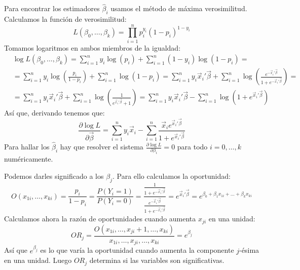 Para encontrar los estimadores $\hat{\beta}_i$ usamos el método de máxima verosimilitud.
Calculamos la función de verosimilitud:
$$L(\beta_0, \dots, \beta_k) = \prod_{i=1}^n p_i^{y_i}(1-p_i)^{1-y_i}$$
Tomamos logaritmos en ambos miembros de la igualdad:
\begin{align*}
     & \log L(\beta_0, \dots, \beta_k) = \sum_{i=1}^n y_i\log(p_i) + \sum_{i=1}^n (1-y_i)\log(1-p_i) =                                                                                                                              \\
     & = \sum_{i=1}^n y_i\log\left(\frac{p_i}{1-p_i}\right) + \sum_{i=1}^n \log(1-p_i) = \sum_{i=1}^n y_i \vec{x}_i'\vec{\beta} + \sum_{i=1}^n \log\left(\frac{e^{-\vec{x}_i'\vec{\beta}}}{1 + e^{-\vec{x}_i'\vec{\beta}}}\right) = \\
     & = \sum_{i=1}^n y_i \vec{x}_i'\vec{\beta} + \sum_{i=1}^n \log\left(\frac{1}{e^{\vec{x}_i'\vec{\beta}} + 1}\right) = \sum_{i=1}^n y_i \vec{x}_i'\vec{\beta} - \sum_{i=1}^n \log(1 + e^{\vec{x}_i'\vec{\beta}})
\end{align*}
Así que, derivando tenemos que:
$$\frac{\partial \log L}{\partial \vec{\beta}} = \sum_{i=1}^n y_i\vec{x}_i - \sum_{i=1}^n \frac{\vec{x}_i e^{\vec{x}_i'\vec{\beta}}}{1 + e^{\vec{x}_i'\vec{\beta}}}$$
Para hallar los $\hat{\beta}_i$ hay que resolver el sistema $\frac{\partial \log L}{\partial \beta_i} = 0$ para todo $i = 0, \dots, k$ numéricamente.

Podemos darles significado a los $\beta_j$.
Para ello calculamos la oportunidad:
$$O(x_{1i}, \dots, x_{ki}) = \frac{p_i}{1-p_i} = \frac{P(Y_i = 1)}{P(Y_i = 0)} = \dfrac{\frac{1}{1+e^{-\vec{x}_i'\vec{\beta}}}}{\frac{e^{-\vec{x}_i'\vec{\beta}}}{1+e^{-\vec{x}_i'\vec{\beta}}}} = e^{\vec{x}_i'\vec{\beta}} = e^{\beta_0 + \beta_1x_{1i} + \dots + \beta_kx_{ki}}$$
Calculamos ahora la razón de oportunidades cuando aumenta $x_{ji}$ en una unidad:
$$OR_j = \frac{O(x_{1i}, \dots, x_{ji}+1, \dots, x_{ki})}{x_{1i}, \dots, x_{ji}, \dots, x_{ki}} = e^{\beta_j}$$
Así que $e^{\beta_j}$ es lo que varía la oportunidad cuando aumenta la componente $j$-ésima en una unidad.
Luego $OR_j$ determina si las variables son significativas.